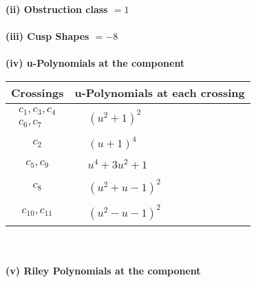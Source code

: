 \documentclass[1p]{elsarticle_modified}
\theoremstyle{definition}
\begin{document}
\flushleft \textbf{(ii) Obstruction class $= 1$}\\~\\
\flushleft \textbf{(iii) Cusp Shapes $= -8$}\\~\\
\newpage\renewcommand{\arraystretch}{1}
\flushleft \textbf{(iv) u-Polynomials at the component}\newline \\
\begin{tabular}{m{50pt}|m{274pt}}
Crossings & \hspace{64pt}u-Polynomials at each crossing \\
\hline $$\begin{aligned}c_{1},c_{3},c_{4}\\c_{6},c_{7}\end{aligned}$$&$\begin{aligned}
&(u^2+1)^2
\end{aligned}$\\
\hline $$\begin{aligned}c_{2}\end{aligned}$$&$\begin{aligned}
&(u+1)^4
\end{aligned}$\\
\hline $$\begin{aligned}c_{5},c_{9}\end{aligned}$$&$\begin{aligned}
&u^4+3 u^2+1
\end{aligned}$\\
\hline $$\begin{aligned}c_{8}\end{aligned}$$&$\begin{aligned}
&(u^2+u-1)^2
\end{aligned}$\\
\hline $$\begin{aligned}c_{10},c_{11}\end{aligned}$$&$\begin{aligned}
&(u^2- u-1)^2
\end{aligned}$\\
\hline
\end{tabular}\\~\\
\newpage\renewcommand{\arraystretch}{1}
\flushleft \textbf{(v) Riley Polynomials at the component}\newline \\
\end{document}
